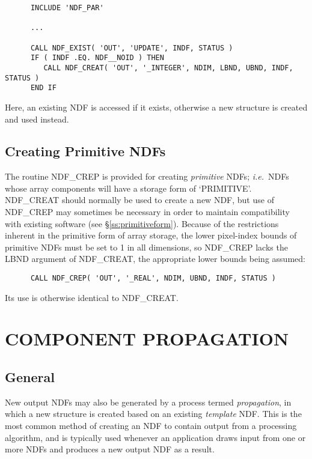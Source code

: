 \documentclass[twoside,11pt]{article}
\newcommand{\htmlref}[2]{#1}
\newcommand{\xlabel}[1]{}
\newcommand{\st}[1]{{\em{#1}}}
\begin{document}
\small
\begin{verbatim}
      INCLUDE 'NDF_PAR'

      ...

      CALL NDF_EXIST( 'OUT', 'UPDATE', INDF, STATUS )
      IF ( INDF .EQ. NDF__NOID ) THEN
         CALL NDF_CREAT( 'OUT', '_INTEGER', NDIM, LBND, UBND, INDF, STATUS )
      END IF
\end{verbatim}
\normalsize

Here, an existing NDF is accessed if it exists, otherwise a new structure
is created and used instead. 

\subsection{\xlabel{creating_primitive_ndfs}\label{ss:crep}Creating Primitive NDFs}

The routine \htmlref{NDF\_CREP}{NDF_CREP} is provided for creating
\st{primitive\/} NDFs; \st{i.e.}\ NDFs whose array components will
have a storage form of `PRIMITIVE'. 
\htmlref{NDF\_CREAT}{NDF_CREAT} should normally be used to create a new NDF, but use of NDF\_CREP
may sometimes be necessary in order to maintain compatibility with existing
software (see \S\ref{ss:primitiveform}). 
Because of the restrictions inherent in the primitive form of array storage,
the lower pixel-index bounds of primitive NDFs must be set to 1 in all
dimensions, so NDF\_CREP lacks the LBND argument of NDF\_CREAT, the
appropriate lower bounds being assumed: 

\small
\begin{verbatim}
      CALL NDF_CREP( 'OUT', '_REAL', NDIM, UBND, INDF, STATUS )
\end{verbatim}
\normalsize

Its use is otherwise identical to NDF\_CREAT.


\section{\xlabel{component_propagation}\label{ss:propagate}COMPONENT PROPAGATION}

\subsection{\xlabel{general_propagation}General}

New output NDFs may also be generated by a process termed \st{propagation},
in which a new structure is created based on an existing \st{template\/} NDF.
This is the most common method of creating an NDF to contain output from a
processing algorithm, and is typically used whenever an application draws
input from one or more NDFs and produces a new output NDF as a result. 
\end{document}
